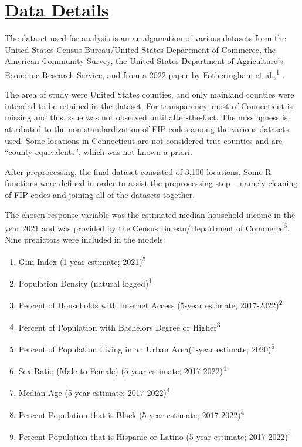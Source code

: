 \documentclass[
]{article}
\begin{document}
\section{\texorpdfstring{\ul{Data
Details}}{Data Details}}\label{data-details}

The dataset used for analysis is an amalgamation of various datasets
from the United States Census Bureau/United States Department of
Commerce, the American Community Survey, the United States Department of
Agriculture's Economic Research Service, and from a 2022 paper by
Fotheringham et al.,\textsuperscript{1} .

The area of study were United States counties, and only mainland
counties were intended to be retained in the dataset. For transparency,
most of Connecticut is missing and this issue was not observed until
after-the-fact. The missingness is attributed to the non-standardization
of FIP codes among the various datasets used. Some locations in
Connecticut are not considered true counties and are ``county
equivalents'', which was not known a-priori.

After preprocessing, the final dataset consisted of 3,100 locations.
Some R functions were defined in order to assist the preprocessing step
-- namely cleaning of FIP codes and joining all of the datasets
together.

The chosen response variable was the estimated median household income
in the year 2021 and was provided by the Census Bureau/Department of
Commerce\textsuperscript{6}. Nine predictors were included in the
models:

\begin{enumerate}
\def\labelenumi{\arabic{enumi}.}
\item
  Gini Index (1-year estimate; 2021)\textsuperscript{5}
\item
  Population Density (natural logged)\textsuperscript{1}
\item
  Percent of Households with Internet Access (5-year estimate;
  2017-2022)\textsuperscript{2}
\item
  Percent of Population with Bachelors Degree or
  Higher\textsuperscript{3}
\item
  Percent of Population Living in an Urban Area(1-year estimate;
  2020)\textsuperscript{6}
\item
  Sex Ratio (Male-to-Female) (5-year estimate;
  2017-2022)\textsuperscript{4}
\item
  Median Age (5-year estimate; 2017-2022)\textsuperscript{4}
\item
  Percent Population that is Black (5-year estimate;
  2017-2022)\textsuperscript{4}
\item
  Percent Population that is Hispanic or Latino (5-year estimate;
  2017-2022)\textsuperscript{4}
\end{enumerate}
\end{document}

